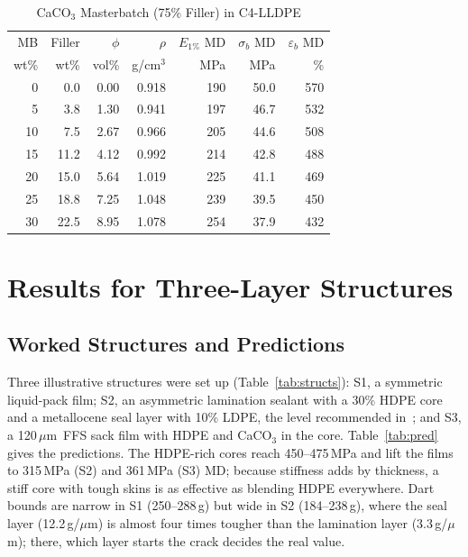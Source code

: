 \documentclass[conference,a4paper]{IEEEtran}
\newcommand{\um}{\,$\mu$m}
\begin{document}
\begin{table}[!t]
\caption{CaCO$_3$ Masterbatch (75\% Filler) in C4-LLDPE}
\label{tab:caco3}\centering\footnotesize
\begin{tabular}{rrrrrrr}
\toprule
MB & Filler & $\phi$ & $\rho$ & $E_{1\%}$ MD & $\sigma_b$ MD & $\varepsilon_b$ MD \\
wt\% & wt\% & vol\% & g/cm$^3$ & MPa & MPa & \% \\
\midrule
0 & 0.0 & 0.00 & 0.918 & 190 & 50.0 & 570 \\
5 & 3.8 & 1.30 & 0.941 & 197 & 46.7 & 532 \\
10 & 7.5 & 2.67 & 0.966 & 205 & 44.6 & 508 \\
15 & 11.2 & 4.12 & 0.992 & 214 & 42.8 & 488 \\
20 & 15.0 & 5.64 & 1.019 & 225 & 41.1 & 469 \\
25 & 18.8 & 7.25 & 1.048 & 239 & 39.5 & 450 \\
30 & 22.5 & 8.95 & 1.078 & 254 & 37.9 & 432 \\
\bottomrule
\end{tabular}
\end{table}

\section{Results for Three-Layer Structures}
\subsection{Worked Structures and Predictions}
Three illustrative structures were set up (Table~\ref{tab:structs}): S1, a symmetric liquid-pack film; S2, an asymmetric lamination sealant with a 30\% HDPE core and a metallocene seal layer with 10\% LDPE, the level recommended in~\cite{tas}; and S3, a 120\um\ FFS sack film with HDPE and CaCO$_3$ in the core. Table~\ref{tab:pred} gives the predictions. The HDPE-rich cores reach 450--475\,MPa and lift the films to 315\,MPa (S2) and 361\,MPa (S3) MD; because stiffness adds by thickness, a stiff core with tough skins is as effective as blending HDPE everywhere. Dart bounds are narrow in S1 (250--288\,g) but wide in S2 (184--238\,g), where the seal layer (12.2\,g/$\mu$m) is almost four times tougher than the lamination layer (3.3\,g/$\mu$m); there, which layer starts the crack decides the real value.
\end{document}

